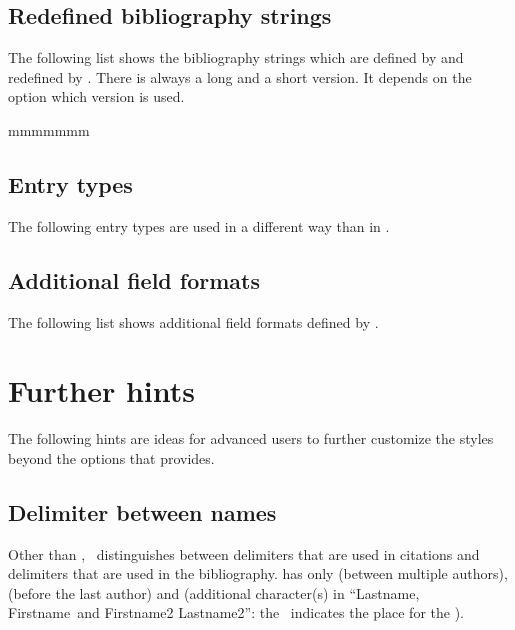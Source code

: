 \documentclass[english]{scrartcl}
\begin{document}
\subsection{Redefined bibliography strings}
The following list shows the bibliography strings which are defined by \bl{}
and redefined by \bldw{}. There is always a long and a short version. 
It depends on the \bl{} option  which version is used. 
\begin{labeling}{mmmmmmm}
\end{labeling}

\subsection{Entry types}
The following entry types are used in a different way than in \bl.

\subsection{Additional field formats}
The following list shows additional field formats defined by \bldw{}.
        

\section{Further hints}
The following hints are ideas for advanced users to further customize
the styles beyond the options that \bldw{} provides.

\subsection{Delimiter between names}
Other than \bl{}, \bldw\ distinguishes between delimiters that are used in
citations and delimiters that are used in the bibliography. \bl{} has only
 (between multiple authors),  (before
the last author) and  (additional character(s) in
\enquote{Lastname, Firstname\textbar\ and Firstname2 Lastname2}: the \textbar\
indicates the place for the ).
\end{document}
